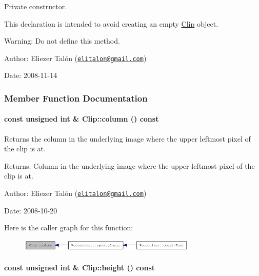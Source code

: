 Private constructor. 

This declaration is intended to avoid creating an empty \hyperlink{class_clip}{Clip} object.

\begin{Desc}
\item[Warning:]Do not define this method.\end{Desc}
\begin{Desc}
\item[Author:]Eliezer Talón (\href{mailto:elitalon@gmail.com}{\tt elitalon@gmail.com}) \end{Desc}
\begin{Desc}
\item[Date:]2008-11-14 \end{Desc}


\subsubsection{Member Function Documentation}
\hypertarget{class_clip_06a34378fa0f23425d10bb04e9972a26}{
\paragraph[{column}]{\setlength{\rightskip}{0pt plus 5cm}const unsigned int \& Clip::column () const}\hfill}
\label{class_clip_06a34378fa0f23425d10bb04e9972a26}


Returns the column in the underlying image where the upper leftmost pixel of the clip is at. 

\begin{Desc}
\item[Returns:]Column in the underlying image where the upper leftmost pixel of the clip is at.\end{Desc}
\begin{Desc}
\item[Author:]Eliezer Talón (\href{mailto:elitalon@gmail.com}{\tt elitalon@gmail.com}) \end{Desc}
\begin{Desc}
\item[Date:]2008-10-20 \end{Desc}


Here is the caller graph for this function:\nopagebreak
\begin{figure}[H]
\begin{center}
\leavevmode
\includegraphics[width=239pt]{class_clip_06a34378fa0f23425d10bb04e9972a26_icgraph}
\end{center}
\end{figure}
\hypertarget{class_clip_939908a8dde602d25335792cc0fd5d97}{
\paragraph[{height}]{\setlength{\rightskip}{0pt plus 5cm}const unsigned int \& Clip::height () const}\hfill}
\label{class_clip_939908a8dde602d25335792cc0fd5d97}


